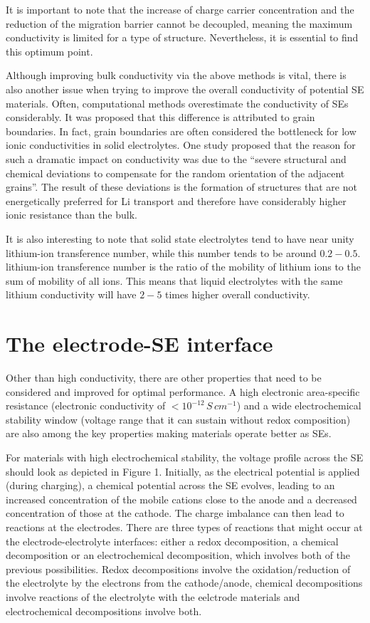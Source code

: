 \documentclass[10pt,a4paper, titlepage]{article}
\begin{document}
It is important to note that the increase of charge carrier concentration and the reduction of the migration barrier cannot be decoupled, meaning the maximum conductivity is limited for a type of structure. \cite{RN30}
Nevertheless, it is essential to find this optimum point.

Although improving bulk conductivity via the above methods is vital, there is also another issue when trying to improve the overall conductivity of potential SE materials.
Often, computational methods overestimate the conductivity of SEs considerably.
It was proposed that this difference is attributed to grain boundaries.
In fact, grain boundaries are often considered the bottleneck for low ionic conductivities in solid electrolytes. 
One study proposed that the reason for such a dramatic impact on conductivity was due to the “severe structural and chemical deviations to compensate for the random orientation of the adjacent grains”. \cite{RN6}
The result of these deviations is the formation of structures that are not energetically preferred for Li transport and therefore have considerably higher ionic resistance than the bulk.

It is also interesting to note that solid state electrolytes tend to have near unity lithium-ion transference number, while this number tends to be around $ 0.2-0.5 $. lithium-ion transference number is the ratio of the mobility of lithium ions to the sum of mobility of all ions. 
This means that liquid electrolytes with the same lithium conductivity will have $ 2-5 $ times higher overall conductivity. \cite{RN30}

\section{The electrode-SE interface}
 
Other than high conductivity, there are other properties that need to be considered and improved for optimal performance. 
A high electronic area-specific resistance (electronic conductivity of $ < 10^{-12} \, S \, cm^{-1} $)\cite{RN3} and a wide electrochemical stability window (voltage range that it can sustain without redox composition) are also among the key properties making materials operate better as SEs. \cite{RN10}

For materials with high electrochemical stability, the voltage profile across the SE should look as depicted in Figure 1.
Initially, as the electrical potential is applied (during charging), a chemical potential across the SE evolves, leading to an increased concentration of the mobile cations close to the anode and a decreased concentration of those at the cathode.
The charge imbalance can then lead to reactions at the electrodes.
There are three types of reactions that might occur at the electrode-electrolyte interfaces: either a redox decomposition, a chemical decomposition or an electrochemical decomposition, which involves both of the previous possibilities.
Redox decompositions involve the oxidation/reduction of the electrolyte by the electrons from the cathode/anode, chemical decompositions involve reactions of the electrolyte with the eelctrode materials and electrochemical decompositions involve both. \cite{RN1}
\end{document}
